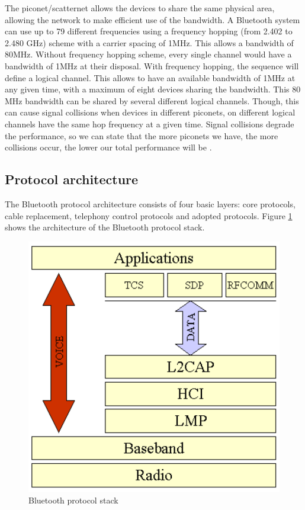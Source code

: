 \documentclass[a4paper, 11pt]{report}
\begin{document}
The piconet/scatternet allows the devices to share the same physical area, allowing the network to make efficient use of the bandwidth. A Bluetooth system can use up to 79 different frequencies using a frequency hopping (from 2.402 to 2.480 GHz) \cite{bluetoothStack} scheme with a carrier spacing of 1MHz. This allows a bandwidth of 80MHz. Without frequency hopping scheme, every single channel would have a bandwidth of 1MHz at their disposal. With frequency hopping, the sequence will define a logical channel. This allows to have an available bandwidth of 1MHz at any given time, with a maximum of eight devices sharing the bandwidth. This 80 MHz bandwidth can be shared by several different logical channels. Though, this can cause signal collisions when devices in different piconets, on different logical channels have the same hop frequency at a given time. Signal collisions degrade the performance, so we can state that the more piconets we have, the more collisions occur, the lower our total performance will be \cite{introBluetooth}.

	\subsection{Protocol architecture}
The Bluetooth protocol architecture consists of four basic layers: core protocols, cable replacement, telephony control protocols and adopted protocols. Figure \ref{fig:bluetoothStack} shows the architecture of the Bluetooth protocol stack.
	\begin{figure}[ht]
		\centering
		\includegraphics[scale=0.5]{images/bluetoothStack.pdf}
		\caption{Bluetooth protocol stack}\label{fig:bluetoothStack}
	\end{figure}
\end{document}
